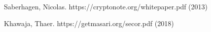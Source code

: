 \documentclass{article}
\begin{document}
\begin{thebibliography}{999}
  Saberhagen, Nicolas.
  \newblock https://cryptonote.org/whitepaper.pdf (2013)

  Khawaja, Thaer.
  \newblock https://getmasari.org/secor.pdf (2018)
\end{thebibliography}
\end{document}
